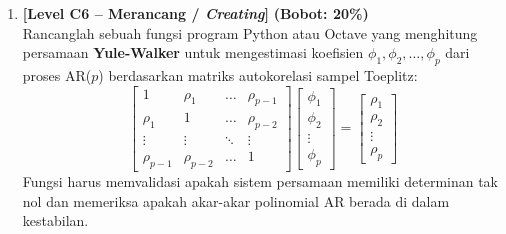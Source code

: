 \documentclass[11pt,a4paper]{article}
\begin{document}
\begin{enumerate}[leftmargin=1.5em, label=\textbf{Soal \arabic*.}]
    \vspace{0.4cm}

    \item \textbf{[Level C6 -- Merancang / \textit{Creating}]} \hfill \textbf{(Bobot: 20\%)} \\
    Rancanglah sebuah fungsi program Python atau Octave yang menghitung persamaan \textbf{Yule-Walker} untuk mengestimasi koefisien $\phi_1, \phi_2, \dots, \phi_p$ dari proses AR($p$) berdasarkan matriks autokorelasi sampel Toeplitz:
    \begin{equation*}
        \begin{bmatrix}
            1 & \rho_1 & \dots & \rho_{p-1} \\
            \rho_1 & 1 & \dots & \rho_{p-2} \\
            \vdots & \vdots & \ddots & \vdots \\
            \rho_{p-1} & \rho_{p-2} & \dots & 1
        \end{bmatrix}
        \begin{bmatrix}
            \phi_1 \\ \phi_2 \\ \vdots \\ \phi_p
        \end{bmatrix}
        =
        \begin{bmatrix}
            \rho_1 \\ \rho_2 \\ \vdots \\ \rho_p
        \end{bmatrix}
    \end{equation*}
    Fungsi harus memvalidasi apakah sistem persamaan memiliki determinan tak nol dan memeriksa apakah akar-akar polinomial AR berada di dalam kestabilan.

\end{enumerate}
\end{document}
